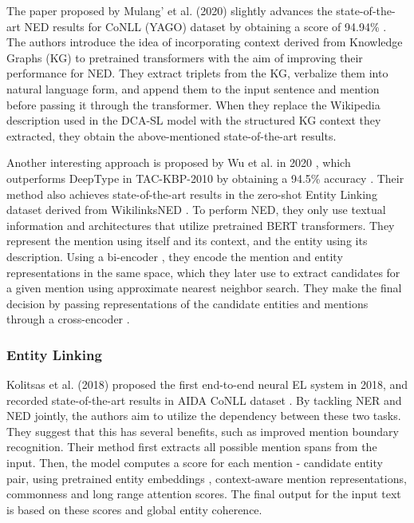 \documentclass{article}
\theoremstyle{definition}
\theoremstyle{remark}
\begin{document}
The paper proposed by Mulang' et al. (2020) \cite{mulang} slightly advances the state-of-the-art NED results for CoNLL (YAGO) \cite{CoNLLYago} dataset by obtaining a score of 94.94\% . The authors introduce the idea of incorporating context derived from Knowledge Graphs (KG) to pretrained transformers with the aim of improving their performance for NED. They extract triplets from the KG, verbalize them into natural language form, and append them to the input sentence and mention before passing it through the transformer. When they replace the Wikipedia description used in the DCA-SL model \cite{dca} with the structured KG context they extracted, they obtain the above-mentioned state-of-the-art results. 

Another interesting approach is proposed by Wu et al. in 2020 \cite{scalablezeroshot}, which outperforms DeepType \cite{raiman} in TAC-KBP-2010 by obtaining a 94.5\% accuracy . Their method also achieves state-of-the-art results in the zero-shot Entity Linking dataset derived from WikilinksNED \cite{wikilinksned}. To perform NED, they only use textual information and architectures that utilize pretrained BERT \cite{BERT} transformers. They represent the mention using itself and its context, and the entity using its description. Using a bi-encoder \cite{polyencoders}, they encode the mention and entity representations in the same space, which they later use to extract candidates for a given mention using approximate nearest neighbor search. They make the final decision by passing representations of the candidate entities and mentions through a cross-encoder \cite{polyencoders}.  

\subsubsection{Entity Linking}
Kolitsas et al. (2018) \cite{kolitsas} proposed the first end-to-end neural EL system in 2018, and recorded state-of-the-art results in AIDA CoNLL dataset \cite{CoNLLYago}. By tackling NER and NED jointly, the authors aim to utilize the dependency between these two tasks. They suggest that this has several benefits, such as improved mention boundary recognition. Their method first extracts all possible mention spans from the input. Then, the model computes a score for each mention - candidate entity pair, using pretrained entity embeddings \cite{kolitsasEmbed}, context-aware mention representations, commonness and long range attention scores. The final output for the input text is based on these scores and global entity coherence. 
\end{document}
